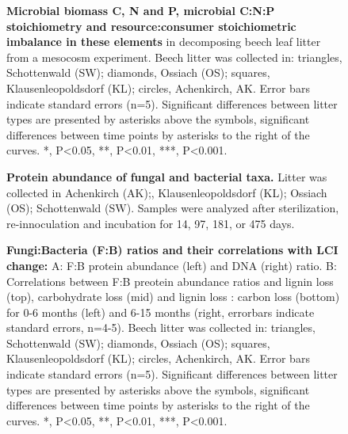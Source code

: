 \documentclass[10pt]{article}
\begin{document}
\begin{flushleft}
\begin{figure}[!h]
\begin{center}
\end{center}
\caption{
{\bf Microbial biomass C, N and P, microbial C:N:P stoichiometry and resource:consumer stoichiometric imbalance in these elements} in decomposing beech leaf litter from a mesocosm experiment. Beech litter was collected in: triangles, Schottenwald (SW); diamonds, Ossiach (OS); squares, Klausenleopoldsdorf (KL); circles, Achenkirch, AK. Error bars indicate standard errors (n=5). Significant differences between litter types are presented by asterisks above the symbols, significant differences between time points by asterisks to the right of the curves. *, P\textless 0.05, **, P\textless 0.01, ***, P\textless 0.001.}
\label{fig:mb}
\end{figure}

\begin{figure}[h!]
\vspace*{2mm}
\begin{center}
\end{center}
\caption{
{\bf Protein abundance of fungal and bacterial taxa.} Litter was collected in Achenkirch (AK);, Klausenleopoldsdorf (KL); Ossiach (OS); Schottenwald (SW). Samples were analyzed after sterilization, re-innoculation and incubation for 14, 97, 181, or 475 days.}
\label{fig:metaprot_barplot}
\end{figure}


\begin{figure}[!h]
\begin{center}
\end{center}
\caption{
{\bf Fungi:Bacteria (F:B) ratios and their correlations with LCI change:} A: F:B protein abundance (left) and DNA (right) ratio. B: Correlations between F:B preotein abundance ratios and lignin loss (top), carbohydrate loss (mid) and lignin loss : carbon loss (bottom) for 0-6 months (left) and 6-15 months (right, errorbars indicate standard errors, n=4-5).  Beech litter was collected in: triangles, Schottenwald (SW); diamonds, Ossiach (OS); squares, Klausenleopoldsdorf (KL); circles, Achenkirch, AK. Error bars indicate standard errors (n=5). Significant differences between litter types are presented by asterisks above the symbols, significant differences between time points by asterisks to the right of the curves. *, P\textless 0.05, **, P\textless 0.01, ***, P\textless 0.001.}
\label{fig:f2b}
\end{figure}


\end{flushleft}
\end{document}
